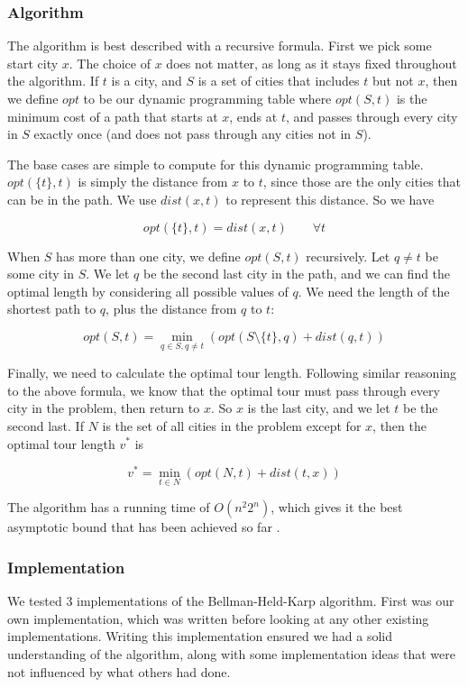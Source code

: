 \documentclass[11pt]{article}
\begin{document}
	\subsubsection{Algorithm}
	
	The algorithm is best described with a recursive formula. First we pick some start city $x$. The choice of $x$ does not matter, as long as it stays fixed throughout the algorithm. If $t$ is a city, and $S$ is a set of cities that includes $t$ but not $x$, then we define $opt$ to be our dynamic programming table where $opt(S,t)$ is the minimum cost of a path that starts at $x$, ends at $t$, and passes through every city in $S$ exactly once (and does not pass through any cities not in $S$).
	
	The base cases are simple to compute for this dynamic programming table. $opt(\{ t \} , t)$ is simply the distance from $x$ to $t$, since those are the only cities that can be in the path. We use $dist(x,t)$ to represent this distance. So we have
	
	\[ opt(\{ t \}, t) = dist(x,t) \qquad \forall t \]
	
	When $S$ has more than one city, we define $opt(S,t)$ recursively. Let $q \neq t$ be some city in $S$. We let $q$ be the second last city in the path, and we can find the optimal length by considering all possible values of $q$. We need the length of the shortest path to $q$, plus the distance from $q$ to $t$:
	
	\[ opt(S,t) = \min_{q \in S, q \neq t} ( opt(S \setminus \{ t \} , q) + dist(q, t) ) \]
	
	Finally, we need to calculate the optimal tour length. Following similar reasoning to the above formula, we know that the optimal tour must pass through every city in the problem, then return to $x$. So $x$ is the last city, and we let $t$ be the second last. If $N$ is the set of all cities in the problem except for $x$, then the optimal tour length $v^*$ is
	
	\[ v^* = \min_{t \in N} ( opt(N , t) + dist(t, x) ) \]
	
	The algorithm has a running time of $O(n^2 2^n)$, which gives it the best asymptotic bound that has been achieved so far \cite{bico}.
	
	\subsubsection{Implementation}
	
	We tested 3 implementations of the Bellman-Held-Karp algorithm. First was our own implementation, which was written before looking at any other existing implementations. Writing this implementation ensured we had a solid understanding of the algorithm, along with some implementation ideas that were not influenced by what others had done.
	
\end{document}
